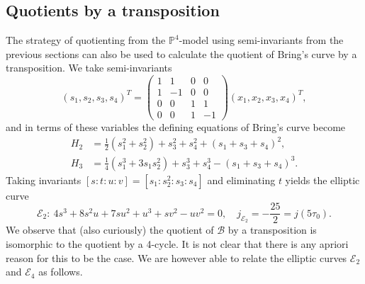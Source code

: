 \documentclass{amsart}
\begin{document}
\subsection{Quotients by a transposition}\label{subsec: quotients by transposition}
The strategy of quotienting from the $\mathbb{P}^4$-model using semi-invariants from the previous sections can also be used to calculate the quotient of Bring's curve by a transposition. We take semi-invariants
\[
(s_1, s_2, s_3, s_4)^T = \begin{pmatrix}
    1 & 1 & 0 & 0 \\ 1 & -1 & 0 & 0 \\ 0 & 0 & 1 & 1 \\ 0 & 0 & 1 & -1
    \end{pmatrix} (x_1, x_2, x_3, x_4)^T  , 
\]
and in terms of these variables the defining equations of Bring's curve become 
\begin{align*}
H_2&=  \frac12( s_1^2+s_2^2)+ s_3^2+s_4^2+ (s_1+s_3+s_4)^2  , \\
H_3&=  \frac14( s_1^3+3 s_1 s_2^2)+ s_3^3+s_4^3 -(s_1+s_3+s_4)^3  .    
\end{align*}
Taking invariants $[s:t:u:v] = [s_1 : s_2^2 : s_3 : s_4]$ and eliminating $t$ yields the elliptic curve
\begin{equation}
\label{qe2p} 
\mathcal{E}_2: \ 4s^3 + 8s^2u + 7s u^2 + u^3 + s v^2 - u v^2=0, \quad j_{\mathcal{E}_2}=-\frac{25}{2} = j(5 \tau_0).
\end{equation}
We observe that (also curiously) the quotient of $\mathcal{B}$ by a transposition is isomorphic to the quotient by a 4-cycle. It is not clear that there is any apriori reason for this to be the case. 
We are however able to relate the elliptic curves $\mathcal{E}_2$ and $\mathcal{E}_4$ as follows.
\end{document}
